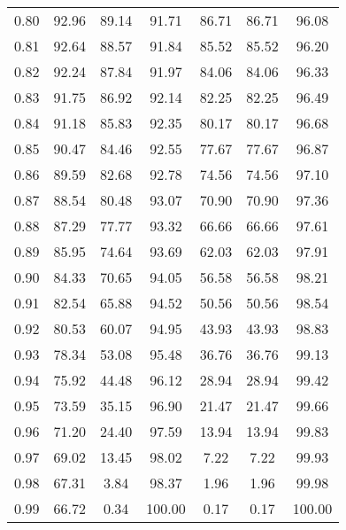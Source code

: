 \begin{tabular}{|c|c|c|c|c|c|c|}
      0.80 &     92.96 &     89.14 &      91.71 &   86.71 &      86.71 &         96.08 \\
      0.81 &     92.64 &     88.57 &      91.84 &   85.52 &      85.52 &         96.20 \\
      0.82 &     92.24 &     87.84 &      91.97 &   84.06 &      84.06 &         96.33 \\
      0.83 &     91.75 &     86.92 &      92.14 &   82.25 &      82.25 &         96.49 \\
      0.84 &     91.18 &     85.83 &      92.35 &   80.17 &      80.17 &         96.68 \\
      0.85 &     90.47 &     84.46 &      92.55 &   77.67 &      77.67 &         96.87 \\
      0.86 &     89.59 &     82.68 &      92.78 &   74.56 &      74.56 &         97.10 \\
      0.87 &     88.54 &     80.48 &      93.07 &   70.90 &      70.90 &         97.36 \\
      0.88 &     87.29 &     77.77 &      93.32 &   66.66 &      66.66 &         97.61 \\
      0.89 &     85.95 &     74.64 &      93.69 &   62.03 &      62.03 &         97.91 \\
      0.90 &     84.33 &     70.65 &      94.05 &   56.58 &      56.58 &         98.21 \\
      0.91 &     82.54 &     65.88 &      94.52 &   50.56 &      50.56 &         98.54 \\
      0.92 &     80.53 &     60.07 &      94.95 &   43.93 &      43.93 &         98.83 \\
      0.93 &     78.34 &     53.08 &      95.48 &   36.76 &      36.76 &         99.13 \\
      0.94 &     75.92 &     44.48 &      96.12 &   28.94 &      28.94 &         99.42 \\
      0.95 &     73.59 &     35.15 &      96.90 &   21.47 &      21.47 &         99.66 \\
      0.96 &     71.20 &     24.40 &      97.59 &   13.94 &      13.94 &         99.83 \\
      0.97 &     69.02 &     13.45 &      98.02 &    7.22 &       7.22 &         99.93 \\
      0.98 &     67.31 &      3.84 &      98.37 &    1.96 &       1.96 &         99.98 \\
      0.99 &     66.72 &      0.34 &     100.00 &    0.17 &       0.17 &        100.00 \\
\bottomrule
\end{tabular}
